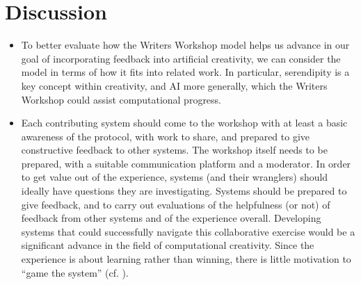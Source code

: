 \section{Discussion}

\begin{itemize} 
\item To better evaluate how the Writers Workshop model helps us
  advance in our goal of incorporating feedback into artificial
  creativity, we can consider the model in terms of how it fits into
  related work. In particular, serendipity is a key concept within
  creativity, and AI more generally, which the Writers Workshop could
  assist computational progress.
\item Each contributing system should come to the workshop with at
  least a basic awareness of the protocol, with work to share, and
  prepared to give constructive feedback to other systems.  The
  workshop itself needs to be prepared, with a suitable communication
  platform and a moderator.  In order to get value out of the
  experience, systems (and their wranglers) should ideally have
  questions they are investigating.  Systems should be prepared to
  give feedback, and to carry out evaluations of the helpfulness (or
  not) of feedback from other systems and of the experience overall.
  Developing systems that could successfully navigate this
  collaborative exercise would be a significant advance in the field
  of computational creativity.  Since the experience is about learning
  rather than winning, there is little motivation to ``game the
  system'' (cf. ).
\end{itemize}
